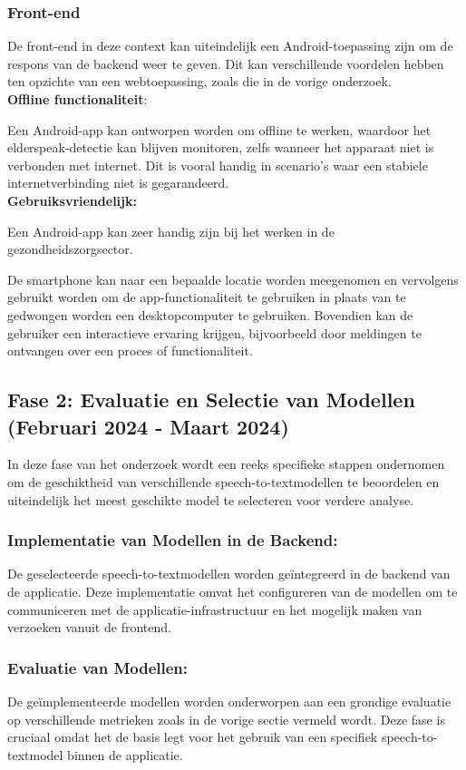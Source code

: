 \subsubsection{Front-end}
De front-end in deze context kan uiteindelijk een Android-toepassing zijn om de respons van de backend weer te geven. Dit kan verschillende voordelen hebben ten opzichte van een webtoepassing, zoals die in de vorige onderzoek.\\
\textbf{Offline functionaliteit}:

Een Android-app kan ontworpen worden om offline te werken, waardoor het elderspeak-detectie kan blijven monitoren, zelfs wanneer het apparaat niet is verbonden met internet. Dit is vooral handig in scenario's waar een stabiele internetverbinding niet is gegarandeerd.\\
\textbf{Gebruiksvriendelijk:}

Een Android-app kan zeer handig zijn bij het werken in de gezondheidszorgsector.

De smartphone kan naar een bepaalde locatie worden meegenomen en vervolgens gebruikt worden om de app-functionaliteit te gebruiken in plaats van te gedwongen worden een desktopcomputer te gebruiken. Bovendien kan de gebruiker een interactieve ervaring krijgen, bijvoorbeeld door meldingen te ontvangen over een proces of functionaliteit.
\subsection{Fase 2: Evaluatie en Selectie van Modellen \\ (Februari 2024 - Maart 2024)}
In deze fase van het onderzoek wordt een reeks specifieke stappen ondernomen om de geschiktheid van verschillende speech-to-textmodellen te beoordelen en uiteindelijk het meest geschikte model te selecteren voor verdere analyse.
\subsubsection{Implementatie van Modellen in de Backend:}
De geselecteerde speech-to-textmodellen worden geïntegreerd in de backend van de applicatie. Deze implementatie omvat het configureren van de modellen om te communiceren met de applicatie-infrastructuur en het mogelijk maken van verzoeken vanuit de frontend.

\subsubsection{Evaluatie van Modellen:}
De geïmplementeerde modellen worden onderworpen aan een grondige evaluatie op verschillende metrieken zoals in de vorige sectie vermeld wordt.
Deze fase is cruciaal omdat het de basis legt voor het gebruik van een specifiek speech-to-textmodel binnen de applicatie.


